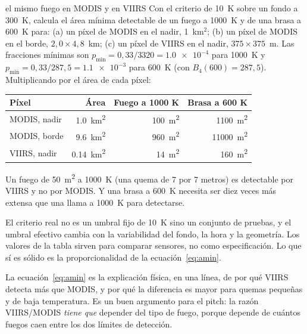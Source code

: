 \begin{ejemplo}{el mismo fuego en MODIS y en VIIRS}
Con el criterio de 10~K sobre un fondo a 300~K, calcula el área mínima detectable de un fuego a
1000~K y de una brasa a 600~K para: (a) un píxel de MODIS en el nadir, 1~km$^2$; (b) un píxel de
MODIS en el borde, $2{,}0\times4{,}8$~km; (c) un píxel de VIIRS en el nadir, $375\times375$~m.
\solucion Las fracciones mínimas son $p_{\min} = 0{,}33/3320 = \num{1.0e-4}$ para 1000~K y
$p_{\min} = 0{,}33/287{,}5 = \num{1.1e-3}$ para 600~K (con $B_4(600) = 287{,}5$). Multiplicando
por el área de cada píxel:
\begin{center}
\begin{tabular}{lrrr}
\toprule
Píxel & Área & Fuego a 1000 K & Brasa a 600 K \\
\midrule
MODIS, nadir & \SI{1.0}{\kilo\metre\squared} & \SI{100}{\metre\squared} & \SI{1100}{\metre\squared} \\
MODIS, borde & \SI{9.6}{\kilo\metre\squared} & \SI{960}{\metre\squared} & \SI{11000}{\metre\squared} \\
VIIRS, nadir & \SI{0.14}{\kilo\metre\squared} & \SI{14}{\metre\squared} & \SI{160}{\metre\squared} \\
\bottomrule
\end{tabular}
\end{center}
Un fuego de \SI{50}{\metre\squared} a 1000~K (una quema de 7 por 7 metros) es detectable por
VIIRS y no por MODIS. Y una brasa a 600~K necesita ser diez veces más extensa que una llama a
1000~K para detectarse.
\end{ejemplo}

\begin{atencion}
El criterio real no es un umbral fijo de 10~K sino un conjunto de pruebas, y el umbral efectivo
cambia con la variabilidad del fondo, la hora y la geometría. Los valores de la tabla sirven
para comparar sensores, no como especificación. Lo que sí es sólido es la proporcionalidad de la
ecuación~\eqref{eq:amin}.
\end{atencion}

\begin{parareto}
La ecuación~\eqref{eq:amin} es la explicación física, en una línea, de por qué VIIRS detecta más
que MODIS, y por qué la diferencia es mayor para quemas pequeñas y de baja temperatura. Es un
buen argumento para el pitch: la razón VIIRS/MODIS \emph{tiene que} depender del tipo de fuego,
porque depende de cuántos fuegos caen entre los dos límites de detección.
\end{parareto}

